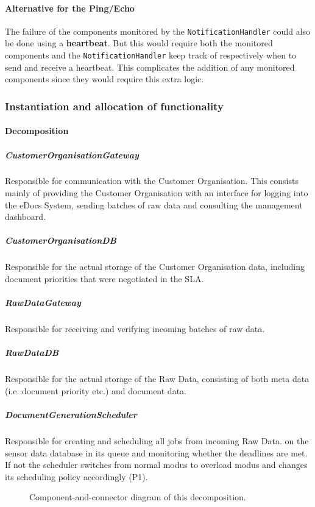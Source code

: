\documentclass[a4paper,10pt]{article}
\begin{document}
\paragraph{Alternative for the Ping/Echo}
The failure of the components monitored by the \texttt{NotificationHandler} could also be done using a \textbf{heartbeat}. But this would require both the monitored components and the \texttt{NotificationHandler} keep track of respectively when to send and receive a heartbeat. This complicates the addition of any monitored components since they would require this extra logic.


\subsubsection{Instantiation and allocation of functionality}
\paragraph{Decomposition}

\subparagraph{CustomerOrganisationGateway}
Responsible for communication with the Customer Organisation. This consists mainly of providing the Customer Organisation with an interface for logging into the eDocs System, sending batches of raw data and consulting the management dashboard.

\subparagraph{CustomerOrganisationDB}
Responsible for the actual storage of the Customer Organisation data, including document priorities that were negotiated in the SLA.

\subparagraph{RawDataGateway}
Responsible for receiving and verifying incoming batches of raw data.

\subparagraph{RawDataDB}
Responsible for the actual storage of the Raw Data, consisting of both meta data (i.e. document priority etc.) and document data.

\subparagraph{DocumentGenerationScheduler}
Responsible for creating and scheduling all jobs from incoming Raw Data. 
 on the sensor data database in its queue and monitoring whether the deadlines are met. If not the scheduler switches from normal modus to overload modus and changes its scheduling policy accordingly (P1).

\begin{figure}[!htp]
    \centering
    \caption{Component-and-connector diagram of this decomposition.
        }\label{fig:it1-cc_main}
\end{figure}
\end{document}
